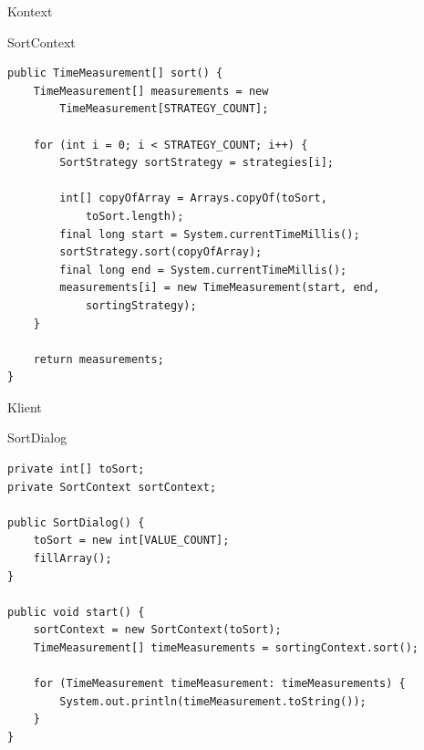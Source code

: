 \begin{frame}[fragile]{Kontext}
	\begin{exampleblock}{SortContext}
 		\begin{lstlisting}
public TimeMeasurement[] sort() {
    TimeMeasurement[] measurements = new 
        TimeMeasurement[STRATEGY_COUNT];
    
    for (int i = 0; i < STRATEGY_COUNT; i++) {
        SortStrategy sortStrategy = strategies[i];
        
        int[] copyOfArray = Arrays.copyOf(toSort, 
            toSort.length);
        final long start = System.currentTimeMillis();
        sortStrategy.sort(copyOfArray);
        final long end = System.currentTimeMillis();
        measurements[i] = new TimeMeasurement(start, end, 
            sortingStrategy);
    }
    
    return measurements;
}
 		\end{lstlisting}
 	\end{exampleblock}
\end{frame}

\begin{frame}[fragile]{Klient}
	\begin{exampleblock}{SortDialog}
 		\begin{lstlisting}
private int[] toSort;
private SortContext sortContext;

public SortDialog() {
    toSort = new int[VALUE_COUNT];
    fillArray();
}

public void start() {
    sortContext = new SortContext(toSort);
    TimeMeasurement[] timeMeasurements = sortingContext.sort();
    
    for (TimeMeasurement timeMeasurement: timeMeasurements) {
        System.out.println(timeMeasurement.toString());
    }
}	    
 		\end{lstlisting}
 	\end{exampleblock}
\end{frame}


